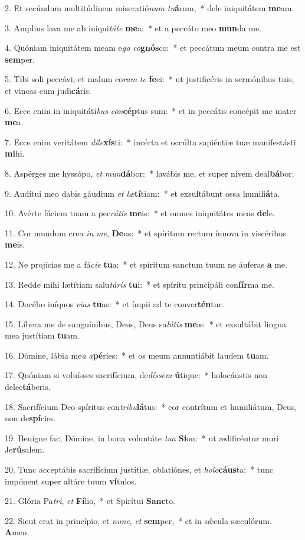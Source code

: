 2. Et secúndum multitúdinem miseratió\textit{num} \textit{tu}\textbf{á}rum,~*  dele iniquitátem \textbf{me}am.\

3. Amplius lava me ab iniqui\textit{tá}\textit{te} \textbf{me}a:~*  et a peccáto meo \textbf{mun}da me.\

4. Quóniam iniquitátem meam e\textit{go} \textit{co}\textbf{gnós}co:~*  et peccátum meum contra me est \textbf{sem}per.\

5. Tibi soli peccávi, et malum co\textit{ram} \textit{te} \textbf{fe}ci:~*  ut justificéris in sermónibus tuis, et vincas cum judi\textbf{cá}ris.\

6. Ecce enim in iniquitáti\textit{bus} \textit{con}\textbf{cép}tus sum:~*  et in peccátis concépit me mater \textbf{me}a.\

7. Ecce enim veritátem \textit{di}\textit{le}\textbf{xís}ti:~*  incérta et occúlta sapiéntiæ tuæ manifestásti \textbf{mi}hi.\

8. Aspérges me hyssópo, \textit{et} \textit{mun}\textbf{dá}bor:~*  lavábis me, et super nivem deal\textbf{bá}bor.\

9. Audítui meo dabis gáudium \textit{et} \textit{læ}\textbf{tí}tiam:~*  et exsultábunt ossa humili\textbf{á}ta.\

10. Avérte fáciem tuam a pec\textit{cá}\textit{tis} \textbf{me}is:~*  et omnes iniquitátes meas \textbf{de}le.\

11. Cor mundum crea \textit{in} \textit{me}, \textbf{De}us:~*  et spíritum rectum ínnova in viscéribus \textbf{me}is.\

12. Ne projícias me a fá\textit{ci}\textit{e} \textbf{tu}a:~*  et spíritum sanctum tuum ne áuferas \textbf{a} me.\

13. Redde mihi lætítiam salu\textit{tá}\textit{ris} \textbf{tu}i:~*  et spíritu principáli con\textbf{fír}ma me.\

14. Docébo iníquos \textit{vi}\textit{as} \textbf{tu}as:~*  et ímpii ad te conver\textbf{tén}tur.\

15. Líbera me de sanguínibus, Deus, Deus sa\textit{lú}\textit{tis} \textbf{me}æ:~*  et exsultábit lingua mea justítiam \textbf{tu}am.\

16. Dómine, lábia me\textit{a} \textit{a}\textbf{pé}ries:~*  et os meum annuntiábit laudem \textbf{tu}am.\

17. Quóniam si voluísses sacrifícium, de\textit{dís}\textit{sem} \textbf{ú}tique:~*  holocáustis non delec\textbf{tá}beris.\

18. Sacrifícium Deo spíritus con\textit{tri}\textit{bu}\textbf{lá}tus:~*  cor contrítum et humiliátum, Deus, non de\textbf{spí}cies.\

19. Benígne fac, Dómine, in bona voluntáte \textit{tu}\textit{a} \textbf{Si}on:~*  ut ædificéntur muri Je\textbf{rú}salem.\

20. Tunc acceptábis sacrifícium justítiæ, oblatiónes, et \textit{ho}\textit{lo}\textbf{cáus}ta:~*  tunc impónent super altáre tuum \textbf{ví}tulos.\

21. Glória Pa\textit{tri}, \textit{et} \textbf{Fí}lio,~*  et Spirítui \textbf{Sanc}to.\

22. Sicut erat in princípio, et \textit{nunc}, \textit{et} \textbf{sem}per,~*  et in sǽcula sæculórum. \textbf{A}men.\

